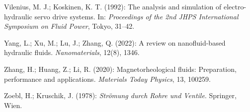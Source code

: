 ﻿\documentclass[a4paper,12pt]{scrreprt}
\theoremstyle{definition}
\begin{document}
\begin{enumerate}[label={[\arabic*]}]
  \item Vilenius, M. J.; Koskinen, K. T. (1992): The analysis and
    simulation of electro-hydraulic servo drive systems.
    In: \textit{Proceedings of the 2nd JHPS International Symposium
    on Fluid Power}, Tokyo, 31--42.

  \item Yang, L.; Xu, M.; Lu, J.; Zhang, Q. (2022): A review on
    nanofluid-based hydraulic fluids. \textit{Nanomaterials}, 12(8),
    1346.

  \item Zhang, H.; Huang, Z.; Li, R. (2020): Magnetorheological fluids:
    Preparation, performance and applications. \textit{Materials Today
    Physics}, 13, 100259.

  \item Zoebl, H.; Kruschik, J. (1978): \textit{Strömung durch
    Rohre und Ventile}. Springer, Wien.

\end{enumerate}
\end{document}
